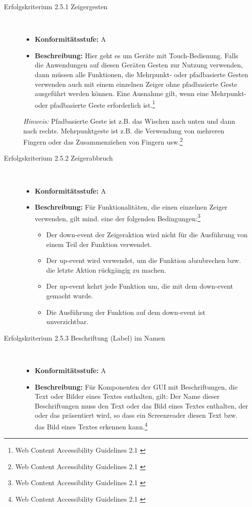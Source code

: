 \begin{description}
\begin{description}
		\item [Erfolgskriterium 2.5.1 Zeigergesten]\hfill \\
		\begin{itemize}
			\item \textbf{Konformitätsstufe:} A
			\item \textbf{Beschreibung:} Hier geht es um Geräte mit Touch-Bedienung. Falls die Anwendungen auf diesen Geräten Gesten zur Nutzung verwenden, dann müssen alle Funktionen, 
			die Mehrpunkt- oder pfadbasierte Gesten verwenden auch mit einem einzelnen Zeiger ohne pfadbasierte Geste ausgeführt werden können. Eine Ausnahme gilt, wenn eine 
			Mehrpunkt- oder pfadbasierte Geste erforderlich ist.\footnote{Web Content Accessibility Guidelines 2.1 \cite{WCAG2.1}}
		\end{itemize}
		
		\textit{Hinweis:} Pfadbasierte Geste ist z.B. das Wischen nach unten und dann nach rechts. Mehrpunktgeste ist z.B. die Verwendung von mehreren Fingern oder das Zusammenziehen von 
		Fingern usw.\footnote{Web Content Accessibility Guidelines 2.1 \cite{WCAG2.1}}
		
		\item [Erfolgskriterium 2.5.2 Zeigerabbruch]\hfill \\
		\begin{itemize}
			\item \textbf{Konformitätsstufe:} A
			\item \textbf{Beschreibung:} Für Funktionalitäten, die einen einzelnen Zeiger verwenden, gilt mind. eine der folgenden 
			Bedingungen:\footnote{Web Content Accessibility Guidelines 2.1 \cite{WCAG2.1}}
			\begin{itemize}
				\item Der down-event der Zeigeraktion wird nicht für die Ausführung von einem Teil der Funktion verwendet.
				\item Der up-event wird verwendet, um die Funktion abzubrechen bzw. die letzte Aktion rückgängig zu machen.
				\item Der up-event kehrt jede Funktion um, die mit dem down-event gemacht wurde.
				\item Die Ausführung der Funktion auf dem down-event ist unverzichtbar.
			\end{itemize}
		\end{itemize}
		
		\item [Erfolgskriterium 2.5.3 Beschriftung (Label) im Namen]\hfill \\
		\begin{itemize}
			\item \textbf{Konformitätsstufe:} A
			\item \textbf{Beschreibung:} Für Komponenten der \ac{GUI} mit Beschriftungen, die Text oder Bilder eines Textes enthalten, gilt: Der Name
			dieser Beschriftungen muss den Text oder das Bild eines Textes enthalten, der oder das präsentiert wird, so dass ein Screenreader diesen Text bzw. das Bild eines Textes 
			erkennen kann.\footnote{Web Content Accessibility Guidelines 2.1 \cite{WCAG2.1}}
		\end{itemize}
		

\end{description}
\end{description}
